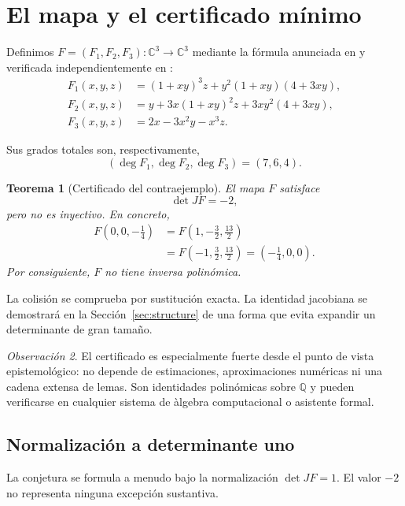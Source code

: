 \documentclass[11pt]{article}
\newtheorem{theorem}{Teorema}[section]
\theoremstyle{definition}
\theoremstyle{remark}
\newtheorem{remark}[theorem]{Observaci\'on}
\newcommand{\C}{\mathbb{C}}
\newcommand{\Q}{\mathbb{Q}}
\begin{document}
\section{El mapa y el certificado m\'inimo}

Definimos $F=(F_1,F_2,F_3)\colon\C^3\to\C^3$ mediante la f\'ormula anunciada
en \cite{AlpogeAnnouncement2026} y verificada independientemente en
\cite{CounterexampleNote2026}:
\begin{align}
F_1(x,y,z)&=(1+xy)^3z+y^2(1+xy)(4+3xy),\label{eq:F1}\\
F_2(x,y,z)&=y+3x(1+xy)^2z+3xy^2(4+3xy),\label{eq:F2}\\
F_3(x,y,z)&=2x-3x^2y-x^3z.\label{eq:F3}
\end{align}

Sus grados totales son, respectivamente,
\[
(\deg F_1,\deg F_2,\deg F_3)=(7,6,4).
\]

\begin{theorem}[Certificado del contraejemplo]\label{thm:counterexample}
El mapa $F$ satisface
\[
\det JF=-2,
\]
pero no es inyectivo. En concreto,
\begin{align*}
F\left(0,0,-\frac14\right)
&=F\left(1,-\frac32,\frac{13}{2}\right)\\
&=F\left(-1,\frac32,\frac{13}{2}\right)
=\left(-\frac14,0,0\right).
\end{align*}
Por consiguiente, $F$ no tiene inversa polin\'omica.
\end{theorem}

La colisi\'on se comprueba por sustituci\'on exacta. La identidad jacobiana se
demostrar\'a en la Secci\'on~\ref{sec:structure} de una forma que evita expandir
un determinante de gran tama\~no.

\begin{remark}
El certificado es especialmente fuerte desde el punto de vista epistemol\'ogico:
no depende de estimaciones, aproximaciones num\'ericas ni una cadena extensa de
lemas. Son identidades polin\'omicas sobre $\Q$ y pueden verificarse en cualquier
sistema de \`algebra computacional o asistente formal.
\end{remark}

\subsection{Normalizaci\'on a determinante uno}

La conjetura se formula a menudo bajo la normalizaci\'on $\det JF=1$. El valor
$-2$ no representa ninguna excepci\'on sustantiva.
\end{document}
